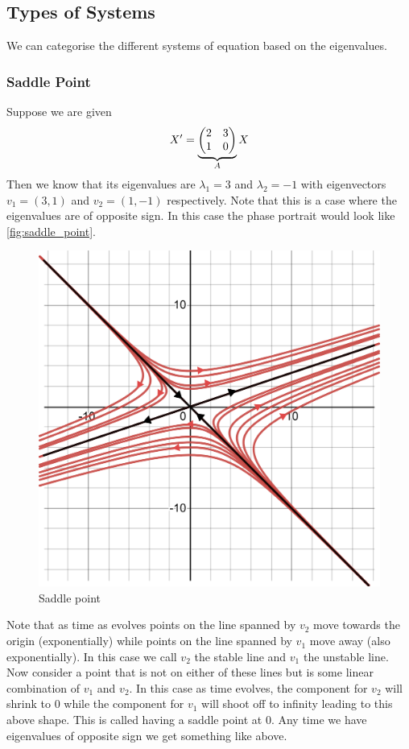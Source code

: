 \subsection{Types of Systems}
We can categorise the different systems of equation based on the eigenvalues.

\subsubsection{Saddle Point}
Suppose we are given 
\begin{equation}
    X' = \underbrace{\begin{pmatrix} 2 & 3\\1 & 0 \end{pmatrix}}_{A} X
\end{equation}
Then we know that its eigenvalues are $\lambda_1 = 3$ and $\lambda_2 = -1$ with eigenvectors $v_1 = (3, 1)$ and $v_2 = (1, -1)$ respectively. Note that this is a case where the eigenvalues are of opposite sign. In this case the phase portrait would look like \autoref{fig:saddle_point}.
\begin{figure}[h]
    \centering
    \includegraphics[scale=0.35]{Images/saddle_point.png}
    \caption{Saddle point}
    \label{fig:saddle_point}
\end{figure}

Note that as time as evolves points on the line spanned by $v_2$ move towards the origin (exponentially) while points on the line spanned by $v_1$ move away (also exponentially). In this case we call $v_2$ the stable line and $v_1$ the unstable line. Now consider a point that is not on either of these lines but is some linear combination of $v_1$ and $v_2$. In this case as time evolves, the component for $v_2$ will shrink to 0 while the component for $v_1$ will shoot off to infinity leading to this above shape. This is called having a saddle point at 0. Any time we have eigenvalues of opposite sign we get something like above.

